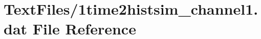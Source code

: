 \hypertarget{1time2histsim__channel1_8dat}{}\section{Text\+Files/1time2histsim\+\_\+channel1.dat File Reference}
\label{1time2histsim__channel1_8dat}
